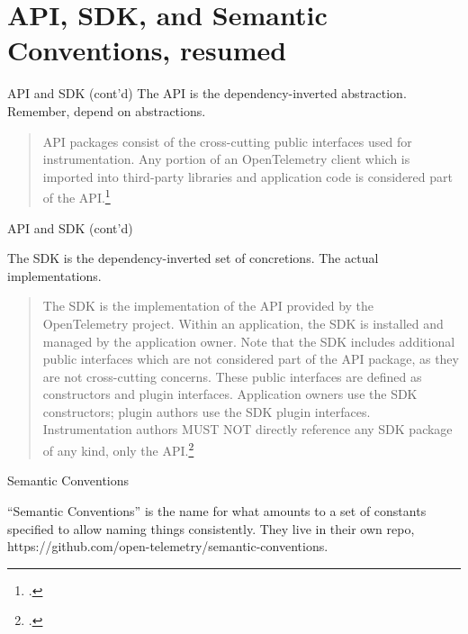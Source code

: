 \documentclass[aspectratio=169]{beamer}
\begin{document}
\section{API, SDK, and Semantic Conventions, resumed}

\begin{frame}{API and SDK (cont'd)}
  The API is the dependency-inverted abstraction. Remember, depend on
  abstractions.

  \vspace{1em}

  \begin{quote}

    API packages consist of the cross-cutting public interfaces used for
    instrumentation. Any portion of an OpenTelemetry client which is imported
    into third-party libraries and application code is considered part of the
    API.\footcite{otel-overview}

  \end{quote}

\end{frame}

\begin{frame}{API and SDK (cont'd)}

  The SDK is the dependency-inverted set of concretions. The actual
  implementations.

  \vspace{1em}

  \begin{quote}

    The SDK is the implementation of the API provided by the OpenTelemetry
    project. Within an application, the SDK is installed and managed by the
    application owner. Note that the SDK includes additional public interfaces
    which are not considered part of the API package, as they are not
    cross-cutting concerns. These public interfaces are defined as constructors
    and plugin interfaces. Application owners use the SDK constructors; plugin
    authors use the SDK plugin interfaces. Instrumentation authors MUST NOT
    directly reference any SDK package of any kind, only the
    API.\footcite{otel-overview}

  \end{quote}
\end{frame}

\begin{frame}{Semantic Conventions}

  ``Semantic Conventions'' is the name for what amounts to a set of constants
  specified to allow naming things consistently. They live in their own repo,
  https://github.com/open-telemetry/semantic-conventions.

\end{frame}
\end{document}
